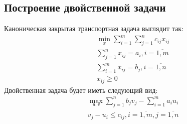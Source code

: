 \subsection{Построение двойственной задачи}
Каноническая закрытая транспортная задача выглядит так:
\begin{align*}
& \min_x \sum_{i=1}^m \sum_{j=1}^n c_{ij} x_{ij} \\ 
& \sum_{j=1}^n x_{ij} = a_i, i=\overline{1,m} \\
& \sum_{i=1}^m x_{ij} = b_j, i=\overline{1,n} \\
& x_{ij} \geq 0
\end{align*} 
Двойственная задача будет иметь следующий вид:
\begin{align*}
& \max_{u,v} \sum_{j=1}^n b_j v_j - \sum_{i=1}^m a_i u_i \\ 
& v_j - u_i \leq c_{ij}, i=\overline{1,m}, j=\overline{1,n}
\end{align*} 

